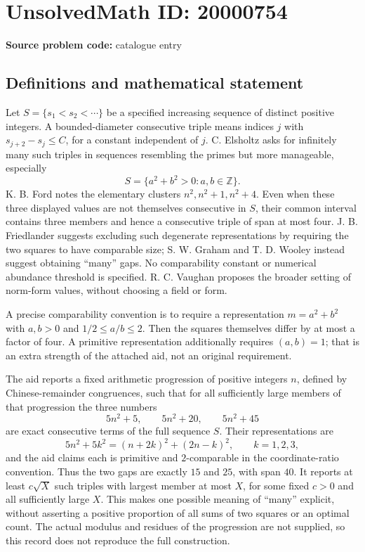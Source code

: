 \documentclass[11pt]{article}
\newcommand{\Z}{\mathbb{Z}}
\begin{document}
\section*{UnsolvedMath ID: 20000754}
\textbf{Source problem code:} catalogue entry
\subsection{Definitions and mathematical statement}
Let \(S=\{s_1<s_2<\cdots\}\) be a specified increasing sequence of distinct positive integers. A bounded-diameter consecutive triple means indices \(j\) with \(s_{j+2}-s_j\leq C\), for a constant independent of \(j\). C. Elsholtz asks for infinitely many such triples in sequences resembling the primes but more manageable, especially
\[
S=\{a^2+b^2>0:a,b\in\Z\}.
\]
K. B. Ford notes the elementary clusters \(n^2,n^2+1,n^2+4\). Even when these three displayed values are not themselves consecutive in \(S\), their common interval contains three members and hence a consecutive triple of span at most four. J. B. Friedlander suggests excluding such degenerate representations by requiring the two squares to have comparable size; S. W. Graham and T. D. Wooley instead suggest obtaining ``many'' gaps. No comparability constant or numerical abundance threshold is specified. R. C. Vaughan proposes the broader setting of norm-form values, without choosing a field or form.

A precise comparability convention is to require a representation \(m=a^2+b^2\) with \(a,b>0\) and \(1/2\leq a/b\leq2\). Then the squares themselves differ by at most a factor of four. A primitive representation additionally requires \((a,b)=1\); that is an extra strength of the attached aid, not an original requirement.

The aid reports a fixed arithmetic progression of positive integers \(n\), defined by Chinese-remainder congruences, such that for all sufficiently large members of that progression the three numbers
\[
5n^2+5,\qquad5n^2+20,\qquad5n^2+45
\]
are exact consecutive terms of the full sequence \(S\). Their representations are
\[
5n^2+5k^2=(n+2k)^2+(2n-k)^2,\qquad k=1,2,3,
\]
and the aid claims each is primitive and \(2\)-comparable in the coordinate-ratio convention. Thus the two gaps are exactly \(15\) and \(25\), with span \(40\). It reports at least \(c\sqrt X\) such triples with largest member at most \(X\), for some fixed \(c>0\) and all sufficiently large \(X\). This makes one possible meaning of ``many'' explicit, without asserting a positive proportion of all sums of two squares or an optimal count. The actual modulus and residues of the progression are not supplied, so this record does not reproduce the full construction.
\end{document}
